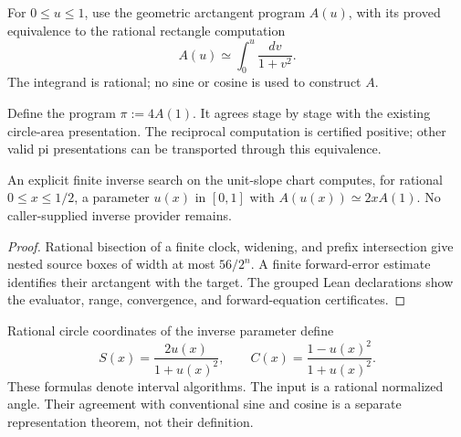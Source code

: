 \begin{definition}\label{def:c3-arctan}
\leanok
For $0\le u\le1$, use the geometric arctangent program $A(u)$, with its
proved equivalence to the rational rectangle computation
\[
 A(u)\simeq\int_0^u\frac{dv}{1+v^2}.
\]
The integrand is rational; no sine or cosine is used to construct $A$.
\end{definition}

\begin{definition}\label{def:c3-pi}
\leanok
Define the program $\pi:=4A(1)$. It agrees stage by stage with the existing
circle-area presentation. The reciprocal computation is certified positive;
other valid pi presentations can be transported through this equivalence.
\end{definition}

\begin{lemma}\label{lem:c3-inverse}
\leanok
An explicit finite inverse search on the unit-slope chart computes, for
rational $0\le x\le1/2$, a parameter $u(x)$ in $[0,1]$ with
$A(u(x))\simeq2xA(1)$. No caller-supplied inverse provider remains.
\end{lemma}
\begin{proof}\leanok
Rational bisection of a finite clock, widening, and prefix intersection give
nested source boxes of width at most $56/2^n$. A finite forward-error estimate
identifies their arctangent with the target. The grouped Lean declarations
show the evaluator, range, convergence, and forward-equation certificates.
\end{proof}

\begin{definition}\label{def:c3-trig}
\leanok
Rational circle coordinates of the inverse parameter define
\[
 S(x)=\frac{2u(x)}{1+u(x)^2},\qquad C(x)=\frac{1-u(x)^2}{1+u(x)^2}.
\]
These formulas denote interval algorithms. The input is a rational normalized
angle. Their agreement with conventional sine and cosine is a separate
representation theorem, not their definition.
\end{definition}


